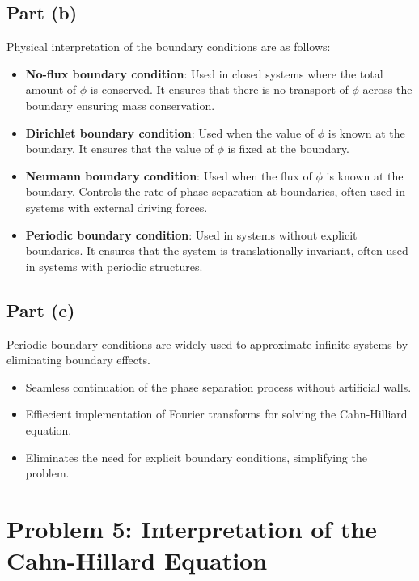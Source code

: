 \documentclass[12pt]{article}
\begin{document}
\subsection*{Part (b)}
Physical interpretation of the boundary conditions are as follows:
\begin{itemize}
    \item \textbf{No-flux boundary condition}: Used in closed systems where the total amount of $\phi$ is conserved. It ensures that there is no transport of $\phi$ across the boundary ensuring mass conservation.
    \item \textbf{Dirichlet boundary condition}: Used when the value of $\phi$ is known at the boundary. It ensures that the value of $\phi$ is fixed at the boundary. 
    \item \textbf{Neumann boundary condition}: Used when the flux of $\phi$ is known at the boundary. Controls the rate of phase separation at boundaries, often used in systems with external driving forces.
    \item \textbf{Periodic boundary condition}: Used in systems without explicit boundaries. It ensures that the system is translationally invariant, often used in systems with periodic structures.
\end{itemize}

\subsection*{Part (c)}
Periodic boundary conditions are widely used to approximate infinite systems by eliminating boundary effects. 
\begin{itemize}
    \item Seamless continuation of the phase separation process without artificial walls.
    \item Effiecient implementation of Fourier transforms for solving the Cahn-Hilliard equation.
    \item Eliminates the need for explicit boundary conditions, simplifying the problem.
\end{itemize}

\section*{Problem 5: Interpretation of the Cahn-Hillard Equation}
\end{document}
